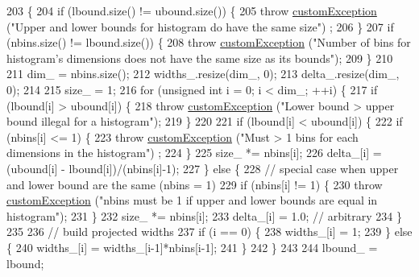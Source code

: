 \begin{DoxyCode}
203                                                                                                            
                                       \{
204     \textcolor{keywordflow}{if} (lbound.size() != ubound.size()) \{
205         \textcolor{keywordflow}{throw} \hyperlink{classcustom_exception}{customException} (\textcolor{stringliteral}{"Upper and lower bounds for histogram do have the same size"})
      ;
206     \}
207     \textcolor{keywordflow}{if} (nbins.size() != lbound.size()) \{
208         \textcolor{keywordflow}{throw} \hyperlink{classcustom_exception}{customException} (\textcolor{stringliteral}{"Number of bins for histogram's dimensions does not have the
       same size as its bounds"});
209     \}
210 
211     dim\_ = nbins.size();
212     widths\_.resize(dim\_, 0);
213     delta\_.resize(dim\_, 0);
214 
215     size\_ = 1;
216     \textcolor{keywordflow}{for} (\textcolor{keywordtype}{unsigned} \textcolor{keywordtype}{int} i = 0; i < dim\_; ++i) \{
217         \textcolor{keywordflow}{if} (lbound[i] > ubound[i]) \{
218             \textcolor{keywordflow}{throw} \hyperlink{classcustom_exception}{customException} (\textcolor{stringliteral}{"Lower bound > upper bound illegal for a histogram"});
219         \}
220 
221         \textcolor{keywordflow}{if} (lbound[i] < ubound[i]) \{
222             \textcolor{keywordflow}{if} (nbins[i] <= 1) \{
223                 \textcolor{keywordflow}{throw} \hyperlink{classcustom_exception}{customException} (\textcolor{stringliteral}{"Must > 1 bins for each dimensions in the histogram"})
      ;
224             \}
225             size\_ *= nbins[i];
226             delta\_[i] = (ubound[i] - lbound[i])/(nbins[i]-1);
227         \} \textcolor{keywordflow}{else} \{
228             \textcolor{comment}{// special case when upper and lower bound are the same (nbins = 1)}
229             \textcolor{keywordflow}{if} (nbins[i] != 1) \{
230                 \textcolor{keywordflow}{throw} \hyperlink{classcustom_exception}{customException} (\textcolor{stringliteral}{"nbins must be 1 if upper and lower bounds are equal
       in histogram"});
231             \}
232             size\_ *= nbins[i];
233             delta\_[i] = 1.0; \textcolor{comment}{// arbitrary}
234         \}
235 
236         \textcolor{comment}{// build projected widths}
237         \textcolor{keywordflow}{if} (i == 0) \{
238             widths\_[i] = 1;
239         \} \textcolor{keywordflow}{else} \{
240             widths\_[i] = widths\_[i-1]*nbins[i-1];
241         \}
242     \}
243 
244     lbound\_ = lbound;

\end{DoxyCode}
